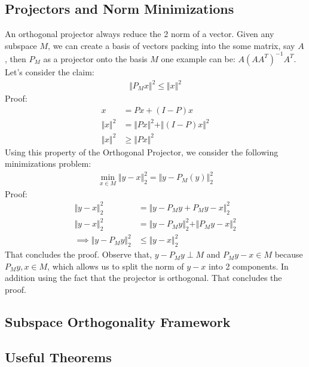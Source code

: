 \documentclass[]{article}
\theoremstyle{definition}
\begin{document}
    \subsection{Projectors and Norm Minimizations}
        An orthogonal projector always reduce the 2 norm of a vector. Given any subspace $M$, we can create a basis of vectors packing into the some matrix, say $A$, then $P_M$ as a projector onto the basis $M$ one example can be: $A(AA^T)^{-1}A^T$. Let's consider the claim: 
        \begin{align}
            \Vert P_Mx\Vert^2 \le \Vert x\Vert^2
        \end{align}
        Proof: 
        \begin{align}
            x &= Px + (I - P)x 
            \\
            \Vert x\Vert^2 &= \Vert Px\Vert^2 + \Vert (I - P)x\Vert^2
            \\
            \Vert x\Vert^2 &\ge \Vert Px\Vert^2
        \end{align}
        Using this property of the Orthogonal Projector, we consider the following minimizations problem: 
        \begin{align}
            \min_{x\in M} \Vert y - x\Vert_2^2 = \Vert y - P_M(y)\Vert_2^2
        \end{align}
        Proof:
        \begin{align}
            \Vert y - x\Vert_2^2 &= 
            \Vert y - P_My + P_My - x\Vert_2^2
            \\
            \Vert y - x\Vert_2^2 &= 
            \Vert y - P_My\Vert_2^2 + \Vert P_My - x\Vert_2^2
            \\
            \implies 
            \Vert y - P_My\Vert_2^2 &\le \Vert y - x\Vert_2^2
        \end{align}
        That concludes the proof. Observe that, $y - P_My\perp M$ and $P_My - x \in M$ because $P_My, x \in M$, which allows us to split the norm of $y - x$ into 2 components. In addition using the fact that the projector is orthogonal. That concludes the proof. 

    \subsection{Subspace Orthogonality Framework}
        
    \subsection{Useful Theorems}
\end{document}

